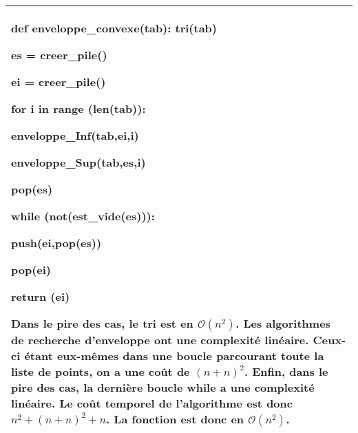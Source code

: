 \documentclass[10pt,fleqn]{article} %
\begin{document}
\subparagraph{} 
\begin{center}
\begin{tabular}{|p{.95\linewidth}|}
\hline
\begin{python}
def enveloppe_convexe(tab):
    tri(tab)
    
    es = creer_pile()
    
    ei = creer_pile()
    
    for i in range (len(tab)):
    
        enveloppe_Inf(tab,ei,i)
        
        enveloppe_Sup(tab,es,i)
        
    pop(es)
    
    while (not(est_vide(es))):
    
        push(ei,pop(es))
        
    pop(ei)
    
    return (ei)
\end{python}

Dans le pire des cas, le tri est en $\mathcal{O}\left(n^2\right)$. 
Les algorithmes de recherche d'enveloppe ont une complexité linéaire. Ceux-ci étant eux-mêmes dans une boucle parcourant toute la liste de points, on a une coût de $(n+n)^2$.
Enfin, dans le pire des cas, la dernière boucle while a une complexité linéaire. Le coût temporel de l'algorithme est donc $n^2+ (n+n)^2 + n$. 
La fonction est donc en $\mathcal{O}\left(n^2\right)$. 
\\
\hline
\end{tabular}
\end{center}
\end{document}
